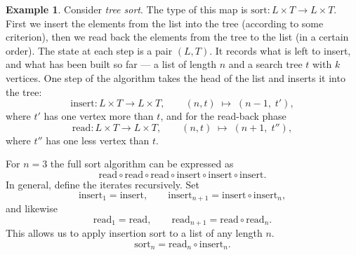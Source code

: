 \documentclass[11pt, a4paper]{article}
\theoremstyle{definition}
\newtheorem{example}[definition]{Example}
\theoremstyle{plain}
\begin{document}
\begin{example}\label{ex:product-state}
Consider \emph{tree sort}.  The type of this map is
$\mathrm{sort} : L \times T \to L \times T$.
First we insert the elements from the list into the
tree (according to some criterion), then we read back the elements
from the tree to the list (in a certain order).  The state at each step
is a pair $(L, T)$.  It records what is left to insert, and what has been built so far
--- a list of length $n$ and a search tree $t$ with $k$ vertices.
One step of the algorithm
takes the head of the list and inserts it into the tree:
\[
  \mathrm{insert} : L \times T \to L \times T, \qquad
  (n, t) \;\longmapsto\; (n-1,\; t'),
\]
where $t'$ has one vertex more than $t$, and for the read-back phase
\[
  \mathrm{read} : L \times T \to L \times T, \qquad
  (n, t) \;\longmapsto\; (n+1,\; t''),
\]
where $t''$ has one less vertex than $t$.

For $n = 3$ the full sort algorithm can be expressed as
\[
  \mathrm{read} \circ \mathrm{read} \circ \mathrm{read}
  \circ \mathrm{insert} \circ \mathrm{insert} \circ \mathrm{insert}.
\]
In general, define the iterates recursively.  Set
\[
  \mathrm{insert}_1 = \mathrm{insert},
  \qquad
  \mathrm{insert}_{n+1} = \mathrm{insert} \circ \mathrm{insert}_n,
\]
and likewise
\[
  \mathrm{read}_1 = \mathrm{read},
  \qquad
  \mathrm{read}_{n+1} = \mathrm{read} \circ \mathrm{read}_n.
\]
This allows us to apply insertion sort to a list of any length $n$.
\[
  \mathrm{sort}_n = \mathrm{read}_n \circ \mathrm{insert}_n.
\]


\end{example}
\end{document}
